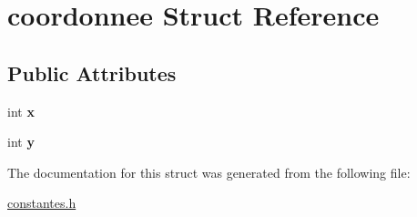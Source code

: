 \hypertarget{structcoordonnee}{\section{coordonnee Struct Reference}
\label{structcoordonnee}
}
\subsection*{Public Attributes}
\begin{DoxyCompactItemize}
\item 
\hypertarget{structcoordonnee_ad03f90b98a158b34350cf67dc5f42e3b}{int {\bfseries x}}\label{structcoordonnee_ad03f90b98a158b34350cf67dc5f42e3b}

\item 
\hypertarget{structcoordonnee_add755fd6d9c74de6f6a2038878209443}{int {\bfseries y}}\label{structcoordonnee_add755fd6d9c74de6f6a2038878209443}

\end{DoxyCompactItemize}


The documentation for this struct was generated from the following file\-:\begin{DoxyCompactItemize}
\item 
\hyperlink{constantes_8h}{constantes.\-h}\end{DoxyCompactItemize}
